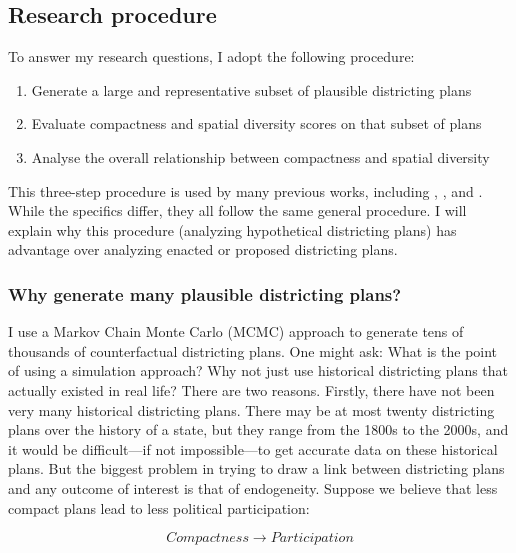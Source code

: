 \documentclass[]{article}
\providecommand{\tightlist}{%
  \setlength{\itemsep}{0pt}\setlength{\parskip}{0pt}}
\begin{document}
\hypertarget{research-procedure}{%
\subsection{Research procedure}\label{research-procedure}}

To answer my research questions, I adopt the following procedure:

\begin{enumerate}
\def\labelenumi{\arabic{enumi}.}
\tightlist
\item
  Generate a large and representative subset of plausible districting
  plans
\item
  Evaluate compactness and spatial diversity scores on that subset of
  plans
\item
  Analyse the overall relationship between compactness and spatial
  diversity
\end{enumerate}

This three-step procedure is used by many previous works, including
\cite{cr2013}, \cite{ddj2019comp}, and \cite{s2020}. While the specifics
differ, they all follow the same general procedure. I will explain why
this procedure (analyzing hypothetical districting plans) has advantage
over analyzing enacted or proposed districting plans.

\hypertarget{why-generate-many-plausible-districting-plans}{%
\subsubsection{Why generate many plausible districting
plans?}\label{why-generate-many-plausible-districting-plans}}

I use a Markov Chain Monte Carlo (MCMC) approach to generate tens of
thousands of counterfactual districting plans. One might ask: What is
the point of using a simulation approach? Why not just use historical
districting plans that actually existed in real life? There are two
reasons. Firstly, there have not been very many historical districting
plans. There may be at most twenty districting plans over the history of
a state, but they range from the 1800s to the 2000s, and it would be
difficult---if not impossible---to get accurate data on these historical
plans. But the biggest problem in trying to draw a link between
districting plans and any outcome of interest is that of endogeneity.
Suppose we believe that less compact plans lead to less political
participation:

\[Compactness \rightarrow Participation\]
\end{document}
